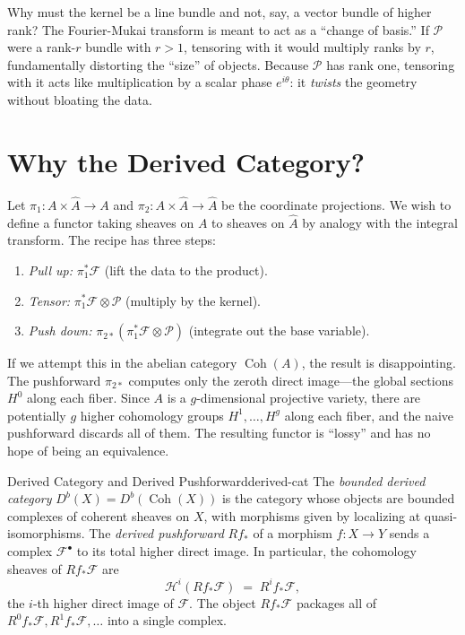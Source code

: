\documentclass{article}
\newcommand{\CF}{{\mathcal{F}}}
\newcommand{\CH}{{\mathcal{H}}}
\newcommand{\CP}{{\mathcal{P}}}
\newcommand{\Coh}{\operatorname{Coh}}
\begin{document}
Why must the kernel be a line bundle and not, say, a vector bundle of higher rank? The Fourier-Mukai transform is meant to act as a ``change of basis.'' If $\CP$ were a rank-$r$ bundle with $r > 1$, tensoring with it would multiply ranks by $r$, fundamentally distorting the ``size'' of objects. Because $\CP$ has rank one, tensoring with it acts like multiplication by a scalar phase $e^{i\theta}$: it \emph{twists} the geometry without bloating the data.


\section{Why the Derived Category?}

Let $\pi_1\colon A \times \hat{A} \to A$ and $\pi_2\colon A \times \hat{A} \to \hat{A}$ be the coordinate projections. We wish to define a functor taking sheaves on $A$ to sheaves on $\hat{A}$ by analogy with the integral transform. The recipe has three steps:
\begin{enumerate}
    \item \emph{Pull up:} $\pi_1^* \CF$ (lift the data to the product).
    \item \emph{Tensor:} $\pi_1^*\CF \otimes \CP$ (multiply by the kernel).
    \item \emph{Push down:} $\pi_{2*}(\pi_1^*\CF \otimes \CP)$ (integrate out the base variable).
\end{enumerate}

If we attempt this in the abelian category $\Coh(A)$, the result is disappointing. The pushforward $\pi_{2*}$ computes only the zeroth direct image---the global sections $H^0$ along each fiber. Since $A$ is a $g$-dimensional projective variety, there are potentially $g$ higher cohomology groups $H^1, \ldots, H^g$ along each fiber, and the naive pushforward discards all of them. The resulting functor is ``lossy'' and has no hope of being an equivalence.

\begin{defn}{Derived Category and Derived Pushforward}{derived-cat}
The \emph{bounded derived category} $D^b(X) = D^b(\Coh(X))$ is the category whose objects are bounded complexes of coherent sheaves on $X$, with morphisms given by localizing at quasi-isomorphisms. The \emph{derived pushforward} $Rf_*$ of a morphism $f\colon X \to Y$ sends a complex $\CF^\bullet$ to its total higher direct image. In particular, the cohomology sheaves of $Rf_*\CF$ are
\[
    \CH^i(Rf_*\CF) \;=\; R^i f_*\CF,
\]
the $i$-th higher direct image of $\CF$. The object $Rf_*\CF$ packages all of $R^0 f_*\CF, R^1 f_*\CF, \ldots$ into a single complex.
\end{defn}
\end{document}
